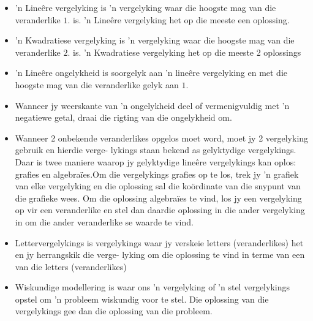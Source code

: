 \begin{itemize}[noitemsep]
\item ’n Lineêre vergelyking is ’n vergelyking waar die hoogste mag van die veranderlike $1$. is. ’n Lineêre vergelyking het op die meeste een oplossing.
\item ’n Kwadratiese vergelyking is ’n vergelyking waar die hoogste mag van die veranderlike $2$. is. ’n Kwadratiese
vergelyking het op die meeste 2 oplossings
\item ’n Lineêre ongelykheid is soorgelyk aan ’n lineêre vergelyking en met die hoogste mag van die veranderlike
gelyk aan $1$.
\item Wanneer jy weerskante van ’n ongelykheid deel of vermenigvuldig met ’n negatiewe getal,
draai die rigting van die ongelykheid om. 
\item Wanneer 2 onbekende veranderlikes opgelos moet word, moet jy 2 vergelyking gebruik en hierdie verge-
lykings staan bekend as gelyktydige vergelykings. Daar is twee maniere waarop jy gelyktydige lineêre
vergelykings kan oplos: grafies en algebraïes.Om die vergelykings grafies op te los, trek jy ’n grafiek
van elke vergelyking en die oplossing sal die koördinate van die snypunt van die grafieke wees. Om die
oplossing algebraïes te vind, los jy een vergelyking op vir een veranderlike en stel dan daardie oplossing
in die ander vergelyking in om die ander veranderlike se waarde te vind.
\item Lettervergelykings is vergelykings waar jy verskeie letters (veranderlikes) het en jy herrangskik die verge-
lyking om die oplossing te vind in terme van een van die letters (veranderlikes)
\item Wiskundige modellering is waar ons ’n vergelyking of ’n stel vergelykings opstel om ’n probleem wiskundig
voor te stel. Die oplossing van die vergelykings gee dan die oplossing van die probleem.
\end{itemize}

